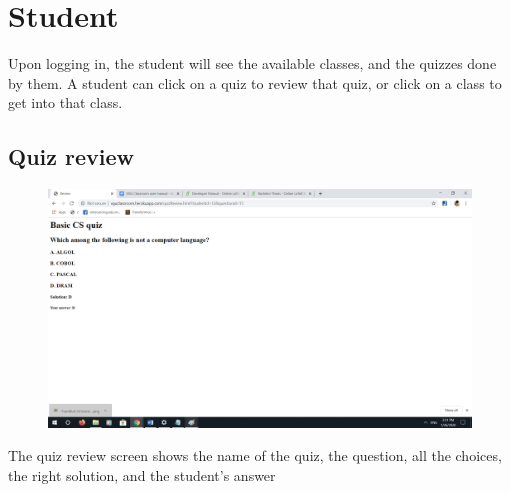 \documentclass[a4paper, 11pt,openany]{book} %
\begin{document}
\section{Student}
Upon logging in, the student will see the available classes, and the quizzes done by them. A student can click on a quiz to review that quiz, or click on a class to get into that class.
\subsection{Quiz review}
\begin{figure}[H]
    \centering
    \includegraphics[width=\textwidth,height=\textheight,keepaspectratio]{images/23.png}
\end{figure}
The quiz review screen shows the name of the quiz, the question, all the choices, the right solution, and the student’s answer
\end{document}
